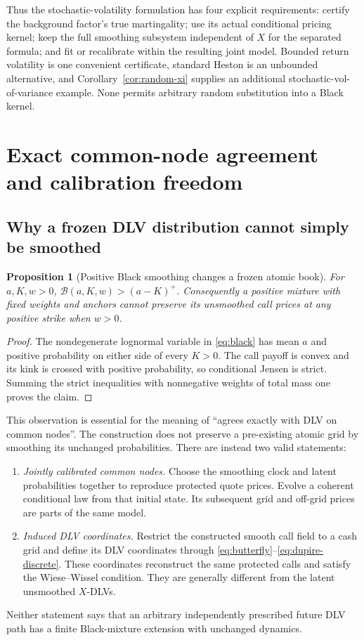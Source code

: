 \documentclass[11pt,a4paper]{article}
\numberwithin{equation}{section}
\newtheorem{proposition}[theorem]{Proposition}
\theoremstyle{definition}\newtheorem{definition}[theorem]{Definition}
\theoremstyle{remark}\newtheorem{remark}[theorem]{Remark}
\newcommand{\Black}{\mathcal B}\newcommand{\LC}{\mathcal L}
\begin{document}
Thus the stochastic-volatility formulation has four explicit requirements: certify the background factor's true martingality; use its actual conditional pricing kernel; keep the full smoothing subsystem independent of $X$ for the separated formula; and fit or recalibrate within the resulting joint model. Bounded return volatility is one convenient certificate, standard Heston is an unbounded alternative, and Corollary~\ref{cor:random-xi} supplies an additional stochastic-vol-of-variance example. None permits arbitrary random substitution into a Black kernel.


\section{Exact common-node agreement and calibration freedom}
\label{sec:matching}
\subsection{Why a frozen DLV distribution cannot simply be smoothed}
\begin{proposition}[Positive Black smoothing changes a frozen atomic book]
\label{prop:frozen}
For $a,K,w>0$, $\Black(a,K,w)>(a-K)^+$. Consequently a positive mixture with fixed weights and anchors cannot preserve its unsmoothed call prices at any positive strike when $w>0$.
\end{proposition}
\begin{proof}
The nondegenerate lognormal variable in \eqref{eq:black} has mean $a$ and positive probability on either side of every $K>0$. The call payoff is convex and its kink is crossed with positive probability, so conditional Jensen is strict. Summing the strict inequalities with nonnegative weights of total mass one proves the claim.
\end{proof}
This observation is essential for the meaning of ``agrees exactly with DLV on common nodes''. The construction does not preserve a pre-existing atomic grid by smoothing its unchanged probabilities. There are instead two valid statements:
\begin{enumerate}
\item \emph{Jointly calibrated common nodes.} Choose the smoothing clock and latent probabilities together to reproduce protected quote prices. Evolve a coherent conditional law from that initial state. Its subsequent grid and off-grid prices are parts of the same model.
\item \emph{Induced DLV coordinates.} Restrict the constructed smooth call field to a cash grid and define its DLV coordinates through \eqref{eq:butterfly}--\eqref{eq:dupire-discrete}. These coordinates reconstruct the same protected calls and satisfy the Wiese--Wissel condition. They are generally different from the latent unsmoothed $X$-DLVs.
\end{enumerate}
Neither statement says that an arbitrary independently prescribed future DLV path has a finite Black-mixture extension with unchanged dynamics.
\end{document}
